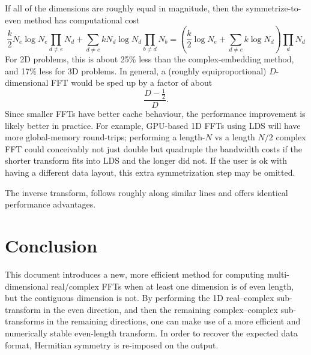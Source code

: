 \documentclass[12pt]{article}
\begin{document}
If all of the dimensions are roughly equal in magnitude, then the
symmetrize-to-even method has computational cost
\begin{dmath}
  \frac{k}{2} N_e \log{N_e} \prod_{d\neq e} N_d
  + \sum_{d \neq e}  k N_d \log{N_d}  \prod_{b\neq d} N_b
  =  \left(\frac{k}{2}  \log{N_e} + \sum_{d \neq e} k \log{N_d} \right)
  \prod_{d}{N_d}
\end{dmath}
For 2D problems, this is about 25\% less than the complex-embedding
method, and 17\% less for 3D problems.  In general, a (roughly
equiproportional) $D$-dimensional FFT would be sped up by a factor of
about
\begin{dmath}
  \frac{D - \frac{1}{2}}{D}.
\end{dmath}
Since smaller FFTs have better cache behaviour, the performance
improvement is likely better in practice.  For example, GPU-based 1D
FFTs using LDS will have more global-memory round-trips; performing a
length-$N$ vs a length $N/2$ complex FFT could conceivably not just
double but quadruple the bandwidth costs if the shorter transform fits
into LDS and the longer did not.  If the user is ok with having a
different data layout, this extra symmetrization step may be omitted.

The inverse transform, follows roughly along similar lines and offers
identical performance advantages.

\section{Conclusion}

This document introduces a new, more efficient method for computing
multi-dimensional real/complex FFTs when at least one dimension is of
even length, but the contiguous dimension is not.  By performing the
1D real--complex sub-transform in the even direction, and then the
remaining complex--complex sub-transforms in the remaining directions,
one can make use of a more efficient and numerically stable
even-length transform.  In order to recover the expected data format,
Hermitian symmetry is re-imposed on the output.  
\end{document}
